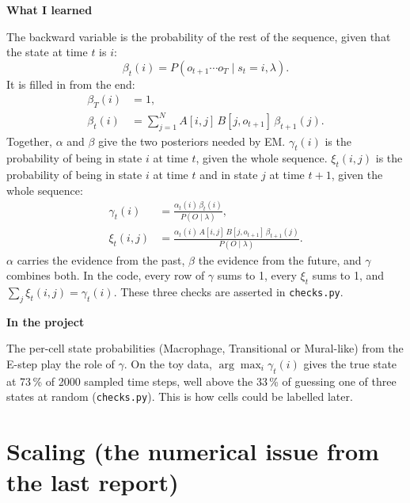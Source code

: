 \documentclass[10pt,a4paper]{article}
\newcommand{\sub}[1]{\vspace{1pt}\textbf{\textcolor{gray!80!black}{#1}}\par}
\begin{document}
\sub{What I learned}
The backward variable is the probability of the rest of the sequence, given that the state at time $t$ is $i$:
\[
\beta_t(i) = P(o_{t+1} \cdots o_T \mid s_t = i, \lambda).
\]
It is filled in from the end:
\begin{align*}
\beta_T(i) &= 1, \\
\beta_t(i) &= \sum_{j=1}^{N} A[i,j]\, B[j,o_{t+1}]\, \beta_{t+1}(j).
\end{align*}
Together, $\alpha$ and $\beta$ give the two posteriors needed by EM. $\gamma_t(i)$ is the probability of being in state $i$ at time $t$, given the whole sequence. $\xi_t(i,j)$ is the probability of being in state $i$ at time $t$ and in state $j$ at time $t+1$, given the whole sequence:
\begin{align*}
\gamma_t(i) &= \frac{\alpha_t(i)\, \beta_t(i)}{P(O \mid \lambda)}, \\
\xi_t(i,j) &= \frac{\alpha_t(i)\, A[i,j]\, B[j,o_{t+1}]\, \beta_{t+1}(j)}{P(O \mid \lambda)} .
\end{align*}
$\alpha$ carries the evidence from the past, $\beta$ the evidence from the future, and $\gamma$ combines both. In the code, every row of $\gamma$ sums to 1, every $\xi_t$ sums to 1, and $\sum_j \xi_t(i,j) = \gamma_t(i)$. These three checks are asserted in \texttt{checks.py}.

\sub{In the project}
The per-cell state probabilities (Macrophage, Transitional or Mural-like) from the E-step play the role of $\gamma$. On the toy data, $\arg\max_i \gamma_t(i)$ gives the true state at 73\,\% of 2000 sampled time steps, well above the 33\,\% of guessing one of three states at random (\texttt{checks.py}). This is how cells could be labelled later.

\section{Scaling (the numerical issue from the last report)}
\end{document}
